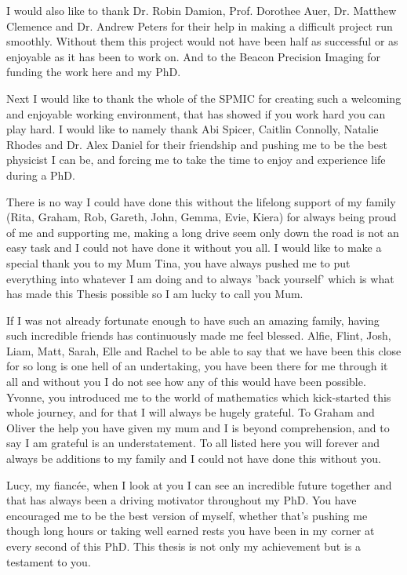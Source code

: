 \documentclass[12pt]{report}
\begin{document}
I would also like to thank Dr. Robin Damion, Prof. Dorothee Auer, Dr. Matthew Clemence and Dr. Andrew Peters for their help in making a difficult project run smoothly. Without them this project would not have been half as successful or as enjoyable as it has been to work on. And to the Beacon Precision Imaging for funding the work here and my PhD.

Next I would like to thank the whole of the SPMIC for creating such a welcoming and enjoyable working environment, that has showed if you work hard you can play hard. I would like to namely thank Abi Spicer, Caitlin Connolly, Natalie Rhodes and Dr. Alex Daniel for their friendship and pushing me to be the best physicist I can be, and forcing me to take the time to enjoy and experience life during a PhD.

There is no way I could have done this without the lifelong support of my family (Rita, Graham, Rob, Gareth, John, Gemma, Evie, Kiera) for always being proud of me and supporting me, making a long drive seem only down the road is not an easy task and I could not have done it without you all. I would like to make a special thank you to my Mum Tina, you have always pushed me to put everything into whatever I am doing and to always 'back yourself' which is what has made this Thesis possible so I am lucky to call you Mum.

If I was not already fortunate enough to have such an amazing family, having such incredible friends has continuously made me feel blessed. Alfie, Flint, Josh, Liam, Matt, Sarah, Elle and Rachel to be able to say that we have been this close for so long is one hell of an undertaking, you have been there for me through it all and without you I do not see how any of this would have been possible. Yvonne, you introduced me to the world of mathematics which kick-started this whole journey, and for that I will always be hugely grateful. To Graham and Oliver the help you have given my mum and I is beyond comprehension, and to say I am grateful is an understatement. To all listed here you will forever and always be additions to my family and I could not have done this without you. 

Lucy, my fianc\'ee, when I look at you I can see an incredible future together and that has always been a driving motivator throughout my PhD. You have encouraged me to be the best version of myself, whether that's pushing me though long hours or taking well earned rests you have been in my corner at every second of this PhD. This thesis is not only my achievement but is a testament to you.
\end{document}
